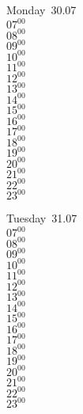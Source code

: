 \documentclass[11pt, a4paper]{book}\usepackage[]{graphicx}\usepackage[]{color}
\begin{document}
\begin{headerbox}
\end{headerbox}
\begin{weekdaybox}
  Monday~30.07\\
  { 
  \vfill
  $07^{00}$\\
$08^{00}$\\
$09^{00}$\\
$10^{00}$\\
$11^{00}$\\
$12^{00}$\\
$13^{00}$\\
$14^{00}$\\
$15^{00}$\\
$16^{00}$\\
$17^{00}$\\
$18^{00}$\\
$19^{00}$\\
$20^{00}$\\
$21^{00}$\\
$22^{00}$\\
$23^{00}$\\
  }
\end{weekdaybox}
\begin{weekdaybox}
  Tuesday~31.07\\
  { 
  \vfill
  $07^{00}$\\
$08^{00}$\\
$09^{00}$\\
$10^{00}$\\
$11^{00}$\\
$12^{00}$\\
$13^{00}$\\
$14^{00}$\\
$15^{00}$\\
$16^{00}$\\
$17^{00}$\\
$18^{00}$\\
$19^{00}$\\
$20^{00}$\\
$21^{00}$\\
$22^{00}$\\
$23^{00}$\\
  }
\end{weekdaybox}
\end{document}
